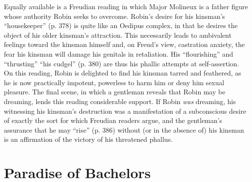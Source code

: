 \documentclass[man,12pt,natbib]{apa6}
\begin{document}
Equally available is a Freudian reading in which Major Molineux is a father
figure whose authority Robin seeks to overcome. Robin's desire for his
kinsman's ``housekeeper'' (p. 378) is quite like an Oedipus complex, in that he
desires the object of his older kinsman's attraction. This necessarily leads to
ambivalent feelings toward the kinsman himself and, on Freud's view, castration
anxiety, the fear his kinsman will damage his genitals in retaliation. His
``flourishing'' and ``thrusting'' ``his cudgel'' (p. 380) are thus his phallic
attempts at self-assertion. On this reading, Robin is delighted to find his
kinsman tarred and feathered, as he is now practically impotent, powerless to
harm him or deny him sexual pleasure. The final scene, in which a gentleman
reveals that Robin may be dreaming, lends this reading considerable support. If
Robin \emph{was} dreaming, his witnessing his kinsman's destruction was a
manifestation of a subconscious desire of exactly the sort for which Freudian
readers argue, and the gentleman's assurance that he may ``rise'' (p. 386)
without (or in the absence of) his kinsman is an affirmation of the victory of
his threatened phallus.

\section{Paradise of Bachelors}
\nocite{Melville12}
\end{document}
